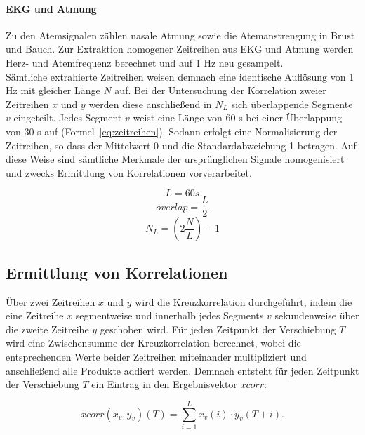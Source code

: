 \paragraph{\acs{EKG} und Atmung}
Zu den Atemsignalen zählen nasale Atmung sowie die Atemanstrengung in Brust und Bauch. Zur Extraktion homogener Zeitreihen aus \acs{EKG} und Atmung werden Herz- und Atemfrequenz berechnet und auf 1 Hz neu gesampelt. \parencite{bashan_network_2012}\\

Sämtliche extrahierte Zeitreihen weisen demnach eine identische Auflösung von 1 Hz mit gleicher Länge $N$ auf. Bei der Untersuchung der Korrelation zweier Zeitreihen $x$ und $y$ werden diese anschließend in $N_L$ sich überlappende Segmente $v$ eingeteilt. Jedes Segment $v$ weist eine Länge von 60 s bei einer Überlappung von 30 s auf (Formel~\ref{eq:zeitreihen}). Sodann erfolgt eine Normalisierung der Zeitreihen, so dass der Mittelwert 0 und die Standardabweichung 1 betragen. Auf diese Weise sind sämtliche Merkmale der ursprünglichen Signale homogenisiert und zwecks Ermittlung von Korrelationen vorverarbeitet.\parencite{bashan_network_2012}

\begin{equation}
L = 60 s \nonumber
\end{equation}
\begin{equation}
overlap = \frac{L}{2} \nonumber
\end{equation}
\begin{equation}
N_L = (2\frac{N}{L})-1
	\label{eq:zeitreihen}
\end{equation}

\subsection{Ermittlung von Korrelationen}\label{korrelationen}

Über zwei Zeitreihen $x$ und $y$ wird die Kreuzkorrelation durchgeführt, indem die eine Zeitreihe $x$ segmentweise und innerhalb jedes Segments $v$ sekundenweise über die zweite Zeitreihe $y$ geschoben wird. Für jeden Zeitpunkt der Verschiebung $T$ wird eine Zwischensumme der Kreuzkorrelation berechnet, wobei die entsprechenden Werte beider Zeitreihen miteinander multipliziert und anschließend alle Produkte addiert werden. Demnach entsteht für jeden Zeitpunkt der Verschiebung $T$ ein Eintrag in den Ergebnisvektor $xcorr$: \parencite{bashan_network_2012}

\begin{equation}
xcorr(x_v, y_v)(T) = \sum \limits_{i=1}^L x_v(i) \cdot y_v(T+i).
	\label{eq:xcorr}
\end{equation}

